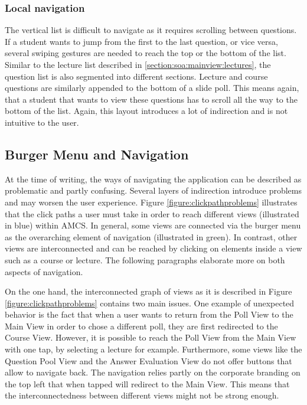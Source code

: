 \subsubsection{Local navigation}

The vertical list is difficult to navigate as it requires scrolling between questions. If a student wants to jump from the first to the last question,  or vice versa, several swiping gestures are needed to reach the top or the bottom of the list.
Similar to the lecture list described in \ref{section:soa:mainview:lectures}, the question list is also segmented into different sections. Lecture and course questions are similarly appended to the bottom of a slide poll. This means again, that a student that wants to view these questions has to scroll all the way to the bottom of the list. Again, this layout introduces a lot of indirection and is not intuitive to the user.


\subsection{Burger Menu and Navigation}
\label{section:con:problems:navigation}

At the time of writing, the ways of navigating the application can be described as problematic and partly confusing. Several layers of indirection introduce problems and may worsen the user experience.
Figure \ref{figure:clickpathproblems} illustrates that the click paths a user must take in order to reach different views (illustrated in blue) within AMCS. In general, some views are connected via the burger menu as the overarching element of navigation (illustrated in green). In contrast, other views are interconnected and can be reached by clicking on elements inside a view such as a course or lecture. The following paragraphs elaborate more on both aspects of navigation.

On the one hand, the interconnected graph of views as it is described in Figure \ref{figure:clickpathproblems} contains two main issues. One example of unexpected behavior is the fact that when a user wants to return from the Poll View to the Main View in order to chose a different poll, they are first redirected to the Course View. However, it is possible to reach the Poll View from the Main View with one tap, by selecting a lecture for example. Furthermore, some views like the Question Pool View and the Answer Evaluation View do not offer buttons that allow to navigate back. The navigation relies partly on the corporate branding on the top left that when tapped will redirect to the Main View.
This means that the interconnectedness between different views might not be strong enough.

